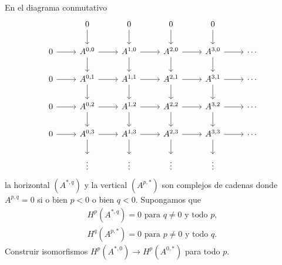\documentclass[twoside]{article}
\begin{document}
\begin{ejercicio}{4.3}
En el diagrama conmutativo
\[
\begin{tikzcd}
& 0\arrow[d] & 0\arrow[d] & 0\arrow[d] & 0\arrow[d] \\
0\arrow[r] & A^{0,0}\arrow[r]\arrow[d] & A^{1,0}\arrow[r]\arrow[d]& A^{2,0}\arrow[r]\arrow[d]  & A^{3,0}\arrow[r]\arrow[d] &\cdots\\
0\arrow[r] & A^{0,1}\arrow[r]\arrow[d] & A^{1,1}\arrow[r]\arrow[d]& A^{2,1}\arrow[r]\arrow[d]  & A^{3,1}\arrow[r]\arrow[d] &\cdots\\
0\arrow[r] & A^{0,2}\arrow[r]\arrow[d] & A^{1,2}\arrow[r]\arrow[d]& A^{2,2}\arrow[r]\arrow[d]  & A^{3,2}\arrow[r]\arrow[d] &\cdots\\
0\arrow[r] & A^{0,3}\arrow[r]\arrow[d] & A^{1,3}\arrow[r]\arrow[d]& A^{2,3}\arrow[r]\arrow[d]  & A^{3,3}\arrow[r]\arrow[d] &\cdots\\
& \vdots & \vdots & \vdots & \vdots
\end{tikzcd}
\]
la horizontal $(A^{*,q})$ y la vertical $(A^{p,*})$ son complejos de cadenas donde $A^{p,q}=0$ si o bien $p<0$ o bien $q<0$. Supongamos que
\begin{gather*}
H^p(A^{*,q})=0\text{ para }q\neq 0\text{ y todo }p,\\
H^q(A^{p,*})=0\text{ para }p\neq 0\text{ y todo }q.
\end{gather*}
Construir isomorfismos $H^p(A^{*,0})\to H^p(A^{0,*})$ para todo $p$.
\end{ejercicio}
\end{document}
